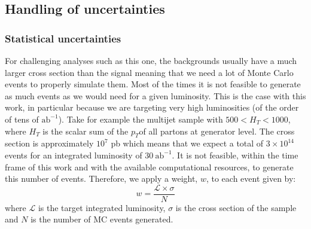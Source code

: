\subsection{Handling of uncertainties}

\subsubsection{Statistical uncertainties}


For challenging analyses such as this one, the backgrounds usually have a much larger cross section than the signal meaning that we need a lot of Monte Carlo events to properly simulate them. Most of the times it is not feasible to generate as much events as we would need for a given luminosity. This is the case with this work, in particular because we are targeting very high luminosities (of the order of tens of $\text{ab}^{-1}$). Take for example the multijet sample with $500<H_T<1000$, where $H_T$ is the scalar sum of the $p_T$of all partons at generator level. The cross section is approximately $10^7$ pb which means that we expect a total of $3\times 10^{14}$ events for an integrated luminosity of $30~\text{ab}^{-1}$. It is not feasible, within the time frame of this work and with the available computational resources, to generate this number of events. Therefore, we apply a weight, $w$, to each event given by:	
\begin{equation}
	w=\frac{\mathcal{L}\times \sigma}{N}
\end{equation}
where $\mathcal{L}$ is the target integrated luminosity, $\sigma$ is the cross section of the sample and $N$ is the number of MC events generated.

